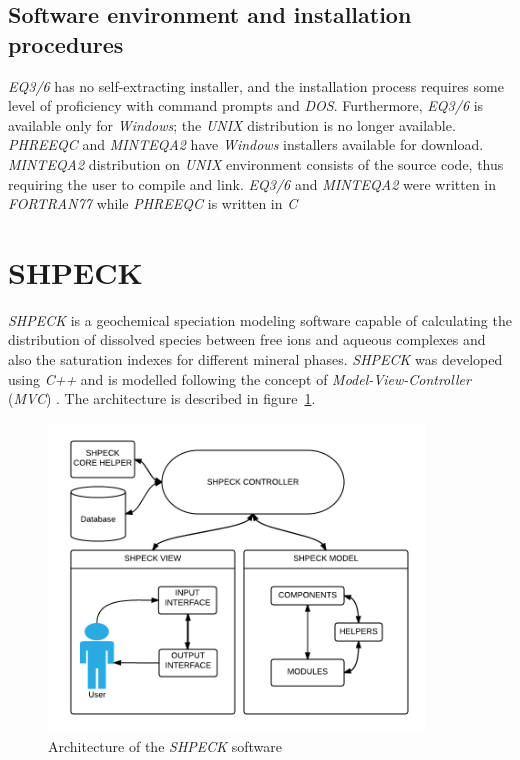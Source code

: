 \documentclass[preprint,12pt,3p]{elsarticle}
\begin{document}
\subsection{Software environment and installation procedures}
\emph{EQ3/6} has no self-extracting installer, and the installation process requires some level of proficiency with command prompts and \emph{DOS}. Furthermore, \emph{EQ3/6} is available only for \emph{Windows}; the \emph{UNIX} distribution is no longer available. \emph{PHREEQC} and \emph{MINTEQA2} have \emph{Windows} installers available for download.  \emph{MINTEQA2} distribution on \emph{UNIX} environment consists of the source code, thus requiring the user to compile and link.
\emph{EQ3/6} and \emph{MINTEQA2} were written in \emph{FORTRAN77} while \emph{PHREEQC} is written in \emph{C}

\section{SHPECK}
\emph{SHPECK} is a geochemical speciation modeling software capable of calculating the distribution of dissolved species between free ions and aqueous complexes and also the saturation indexes for different mineral phases. \emph{SHPECK} was developed using \emph{C++} and is modelled following the concept of \emph{Model-View-Controller} (\emph{MVC}) \cite{Gamma:94}. The architecture is described in figure~\ref{fig:shpeck-architecture}.

\begin{figure}[ht!]
\centering
\includegraphics[width=100mm]{shpeck-architecture.png}
\caption{Architecture of the \emph{SHPECK} software}
\label{fig:shpeck-architecture}
\end{figure}
\end{document}
